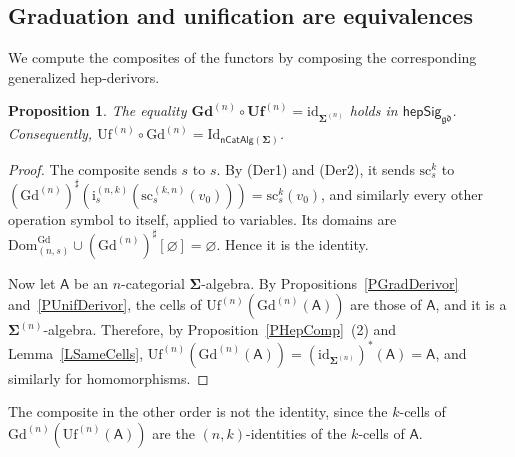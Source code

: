 \documentclass[a4paper,reqno]{amsart}
\newcommand{\sig}[1]{\mathbf{#1}}                %
\newcommand{\calg}[1]{\boldsymbol{\mathsf{#1}}}  %
\newcommand{\Dom}{\mathrm{Dom}}
\newcommand{\id}{\mathrm{id}}
\newcommand{\Id}{\mathrm{Id}}
\newcommand{\gd}{\mathfrak{gd}}
\newcommand{\src}{\mathrm{sc}}
\newcommand{\ii}{\mathrm{i}}
\newcommand{\Gd}{\mathrm{Gd}}
\newcommand{\Uf}{\mathrm{Uf}}
\newcommand{\bGd}{\mathbf{Gd}}
\newcommand{\bUf}{\mathbf{Uf}}
\theoremstyle{plain}
\newtheorem{proposition}[theorem]{Proposition}
\theoremstyle{definition}
\begin{document}
\subsection{Graduation and unification are equivalences}

We compute the composites of the functors by composing the corresponding generalized hep-derivors.

\begin{proposition}\label{PUnifGrad}
The equality $\bGd^{(n)}\circ\bUf^{(n)}=\id_{\sig{\Sigma}^{(n)}}$ holds in $\mathsf{hepSig}_{\gd}$.
Consequently, $\Uf^{(n)}\circ\Gd^{(n)}=\Id_{\mathsf{nCatAlg}(\sig{\Sigma})}$.
\end{proposition}
\begin{proof}
The composite sends $s$ to $s$.
By (Der1) and (Der2), it sends $\src^{k}_{s}$ to $(\Gd^{(n)})^{\sharp}(\ii^{(n,k)}_{s}(\src^{(k,n)}_{s}(v_{0})))=\src^{k}_{s}(v_{0})$, and similarly every other operation symbol to itself, applied to variables.
Its domains are $\Dom^{\Gd}_{(n,s)}\cup(\Gd^{(n)})^{\sharp}[\varnothing]=\varnothing$.
Hence it is the identity.

Now let $\calg{A}$ be an $n$-categorial $\sig{\Sigma}$-algebra.
By Propositions~\ref{PGradDerivor} and~\ref{PUnifDerivor}, the cells of $\Uf^{(n)}(\Gd^{(n)}(\calg{A}))$ are those of $\calg{A}$, and it is a $\sig{\Sigma}^{(n)}$-algebra.
Therefore, by Proposition~\ref{PHepComp}~(2) and Lemma~\ref{LSameCells}, $\Uf^{(n)}(\Gd^{(n)}(\calg{A}))=(\id_{\sig{\Sigma}^{(n)}})^{\ast}(\calg{A})=\calg{A}$, and similarly for homomorphisms.
\end{proof}

The composite in the other order is not the identity, since the $k$-cells of $\Gd^{(n)}(\Uf^{(n)}(\calg{A}))$ are the $(n,k)$-identities of the $k$-cells of $\calg{A}$.
\end{document}
